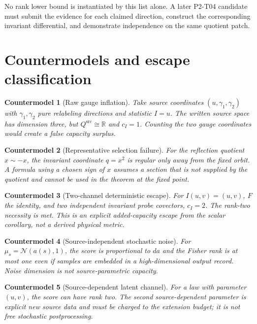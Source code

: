 \documentclass[11pt]{article}
\newtheorem{example}{Countermodel}
\newcommand{\R}{\mathbb{R}}
\newcommand{\QS}{Q^{\mathrm{src}}}
\begin{document}
No rank lower bound is instantiated by this list alone.  A later P2-T04
candidate must submit the evidence for each claimed direction, construct the
corresponding invariant differential, and demonstrate independence on the
same quotient patch.

\section{Countermodels and escape classification}

\begin{example}[Raw gauge inflation]
Take source coordinates \((u,\gamma_1,\gamma_2)\) with
\(\gamma_1,\gamma_2\) pure relabeling directions and statistic \(I=u\).
The written source space has dimension three, but
\(\QS\cong\R\) and \(c_I=1\).  Counting the two gauge coordinates would create
a false capacity surplus.
\end{example}

\begin{example}[Representative selection failure]
For the reflection quotient \(x\sim-x\), the invariant coordinate \(q=x^2\)
is regular only away from the fixed orbit.  A formula using a chosen sign of
\(x\) assumes a section that is not supplied by the quotient and cannot be
used in the theorem at the fixed point.
\end{example}

\begin{example}[Two-channel deterministic escape]
For \(I(u,v)=(u,v)\), \(F\) the identity, and two independent invariant probe
covectors, \(c_I=2\).  The rank-two necessity is met.  This is an explicit
added-capacity escape from the scalar corollary, not a derived physical metric.
\end{example}

\begin{example}[Source-independent stochastic noise]
For \(\mu_s=\mathcal N(a(s),1)\), the score is proportional to \(da\) and the
Fisher rank is at most one even if samples are embedded in a high-dimensional
output record.  Noise dimension is not source-parametric capacity.
\end{example}

\begin{example}[Source-dependent latent channel]
For a law with parameter \((u,v)\), the score can have rank two.  The second
source-dependent parameter is explicit new source data and must be charged to
the extension budget; it is not free stochastic postprocessing.
\end{example}
\end{document}
